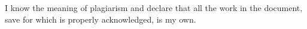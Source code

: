 I know the meaning of plagiarism and declare that all the work in the document, save for which is properly acknowledged, is my own.
\vspace{.8in}


